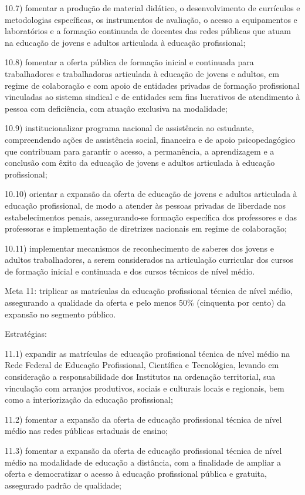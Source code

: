 \documentclass[
]{book}
\begin{document}
10.7) fomentar a produção de material didático, o desenvolvimento de currículos e metodologias específicas, os instrumentos de avaliação, o acesso a equipamentos e laboratórios e a formação continuada de docentes das redes públicas que atuam na educação de jovens e adultos articulada à educação profissional;

10.8) fomentar a oferta pública de formação inicial e continuada para trabalhadores e trabalhadoras articulada à educação de jovens e adultos, em regime de colaboração e com apoio de entidades privadas de formação profissional vinculadas ao sistema sindical e de entidades sem fins lucrativos de atendimento à pessoa com deficiência, com atuação exclusiva na modalidade;

10.9) institucionalizar programa nacional de assistência ao estudante, compreendendo ações de assistência social, financeira e de apoio psicopedagógico que contribuam para garantir o acesso, a permanência, a aprendizagem e a conclusão com êxito da educação de jovens e adultos articulada à educação profissional;

10.10) orientar a expansão da oferta de educação de jovens e adultos articulada à educação profissional, de modo a atender às pessoas privadas de liberdade nos estabelecimentos penais, assegurando-se formação específica dos professores e das professoras e implementação de diretrizes nacionais em regime de colaboração;

10.11) implementar mecanismos de reconhecimento de saberes dos jovens e adultos trabalhadores, a serem considerados na articulação curricular dos cursos de formação inicial e continuada e dos cursos técnicos de nível médio.

Meta 11: triplicar as matrículas da educação profissional técnica de nível médio, assegurando a qualidade da oferta e pelo menos 50\% (cinquenta por cento) da expansão no segmento público.

Estratégias:

11.1) expandir as matrículas de educação profissional técnica de nível médio na Rede Federal de Educação Profissional, Científica e Tecnológica, levando em consideração a responsabilidade dos Institutos na ordenação territorial, sua vinculação com arranjos produtivos, sociais e culturais locais e regionais, bem como a interiorização da educação profissional;

11.2) fomentar a expansão da oferta de educação profissional técnica de nível médio nas redes públicas estaduais de ensino;

11.3) fomentar a expansão da oferta de educação profissional técnica de nível médio na modalidade de educação a distância, com a finalidade de ampliar a oferta e democratizar o acesso à educação profissional pública e gratuita, assegurado padrão de qualidade;
\end{document}
